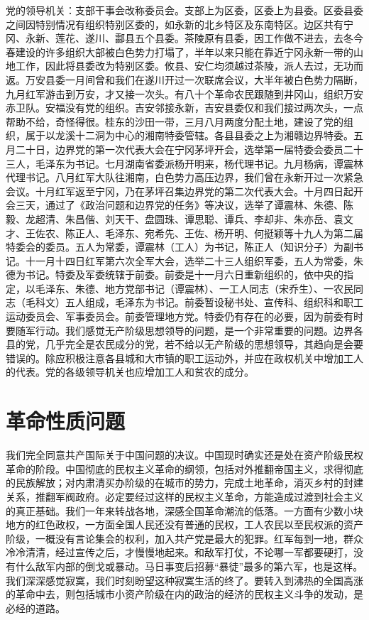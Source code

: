 党的领导机关：支部干事会改称委员会。支部上为区委，区委上为县委。区委县委之间因特别情况有组织特别区委的，如永新的北乡特区及东南特区。边区共有宁冈、永新、莲花、遂川、酃县五个县委。茶陵原有县委，因工作做不进去，去冬今春建设的许多组织大部被白色势力打塌了，半年以来只能在靠近宁冈永新一带的山地工作，因此将县委改为特别区委。攸县、安仁均须越过茶陵，派人去过，无功而返。万安县委一月间曾和我们在遂川开过一次联席会议，大半年被白色势力隔断，九月红军游击到万安，才又接一次头。有八十个革命农民跟随到井冈山，组织万安赤卫队。安福没有党的组织。吉安邻接永新，吉安县委仅和我们接过两次头，一点帮助不给，奇怪得很。桂东的沙田一带，三月八月两度分配土地，建设了党的组织，属于以龙溪十二洞为中心的湘南特委管辖。各县县委之上为湘赣边界特委。五月二十日，边界党的第一次代表大会在宁冈茅坪开会，选举第一届特委会委员二十三人，毛泽东为书记。七月湖南省委派杨开明来，杨代理书记。九月杨病，谭震林代理书记。八月红军大队往湘南，白色势力高压边界，我们曾在永新开过一次紧急会议。十月红军返至宁冈，乃在茅坪召集边界党的第二次代表大会。十月四日起开会三天，通过了《政治问题和边界党的任务》等决议，选举了谭震林、朱德、陈毅、龙超清、朱昌偕、刘天干、盘圆珠、谭思聪、谭兵、李却非、朱亦岳、袁文才、王佐农、陈正人、毛泽东、宛希先、王佐、杨开明、何挺颖等十九人为第二届特委会的委员。五人为常委，谭震林（工人）为书记，陈正人（知识分子）为副书记。十一月十四日红军第六次全军大会，选举二十三人组织军委，五人为常委，朱德为书记。特委及军委统辖于前委。前委是十一月六日重新组织的，依中央的指定，以毛泽东、朱德、地方党部书记（谭震林）、一工人同志（宋乔生）、一农民同志（毛科文）五人组成，毛泽东为书记。前委暂设秘书处、宣传科、组织科和职工运动委员会、军事委员会。前委管理地方党。特委仍有存在的必要，因为前委有时要随军行动。我们感觉无产阶级思想领导的问题，是一个非常重要的问题。边界各县的党，几乎完全是农民成分的党，若不给以无产阶级的思想领导，其趋向是会要错误的。除应积极注意各县城和大市镇的职工运动外，并应在政权机关中增加工人的代表。党的各级领导机关也应增加工人和贫农的成分。

\section{革命性质问题}

我们完全同意共产国际关于中国问题的决议。中国现时确实还是处在资产阶级民权革命的阶段。中国彻底的民权主义革命的纲领，包括对外推翻帝国主义，求得彻底的民族解放；对内肃清买办阶级的在城市的势力，完成土地革命，消灭乡村的封建关系，推翻军阀政府。必定要经过这样的民权主义革命，方能造成过渡到社会主义的真正基础。我们一年来转战各地，深感全国革命潮流的低落。一方面有少数小块地方的红色政权，一方面全国人民还没有普通的民权，工人农民以至民权派的资产阶级，一概没有言论集会的权利，加入共产党是最大的犯罪。红军每到一地，群众冷冷清清，经过宣传之后，才慢慢地起来。和敌军打仗，不论哪一军都要硬打，没有什么敌军内部的倒戈或暴动。马日事变后招募“暴徒”最多的第六军，也是这样。我们深深感觉寂寞，我们时刻盼望这种寂寞生活的终了。要转入到沸热的全国高涨的革命中去，则包括城市小资产阶级在内的政治的经济的民权主义斗争的发动，是必经的道路。

